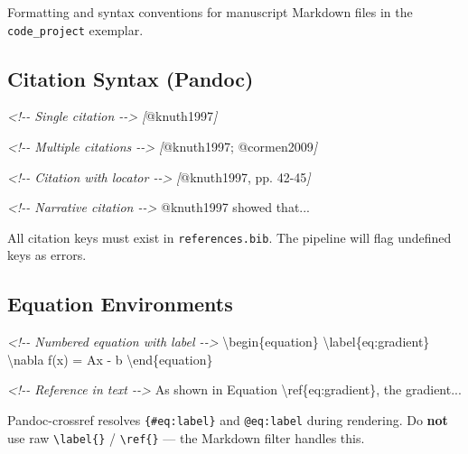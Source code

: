 \documentclass[
]{article}
\newenvironment{Shaded}{}{}
\newcommand{\CommentTok}[1]{\textcolor[rgb]{0.38,0.63,0.69}{\textit{#1}}}
\newcommand{\NormalTok}[1]{#1}
\newcommand{\OtherTok}[1]{\textcolor[rgb]{0.00,0.44,0.13}{#1}}
\begin{document}
Formatting and syntax conventions for manuscript Markdown files in the
\texttt{code\_project} exemplar.

\subsection{Citation Syntax (Pandoc)}\label{citation-syntax-pandoc}

\begin{Shaded}
\begin{Highlighting}[]
\CommentTok{\textless{}!{-}{-} Single citation {-}{-}\textgreater{}}
\CommentTok{[}\OtherTok{@knuth1997}\CommentTok{]}

\CommentTok{\textless{}!{-}{-} Multiple citations {-}{-}\textgreater{}}
\CommentTok{[}\OtherTok{@knuth1997; @cormen2009}\CommentTok{]}

\CommentTok{\textless{}!{-}{-} Citation with locator {-}{-}\textgreater{}}
\CommentTok{[}\OtherTok{@knuth1997, pp. 42{-}45}\CommentTok{]}

\CommentTok{\textless{}!{-}{-} Narrative citation {-}{-}\textgreater{}}
\NormalTok{@knuth1997 showed that...}
\end{Highlighting}
\end{Shaded}

All citation keys must exist in \texttt{references.bib}. The pipeline
will flag undefined keys as errors.

\subsection{Equation Environments}\label{equation-environments}

\begin{Shaded}
\begin{Highlighting}[]
\CommentTok{\textless{}!{-}{-} Numbered equation with label {-}{-}\textgreater{}}
\NormalTok{\textbackslash{}begin\{equation\}}
\NormalTok{\textbackslash{}label\{eq:gradient\}}
\NormalTok{\textbackslash{}nabla f(x) = Ax {-} b}
\NormalTok{\textbackslash{}end\{equation\}}

\CommentTok{\textless{}!{-}{-} Reference in text {-}{-}\textgreater{}}
\NormalTok{As shown in Equation \textbackslash{}ref\{eq:gradient\}, the gradient...}
\end{Highlighting}
\end{Shaded}

Pandoc-crossref resolves \texttt{\{\#eq:label\}} and \texttt{@eq:label}
during rendering. Do \textbf{not} use raw
\texttt{\textbackslash{}label\{\}} / \texttt{\textbackslash{}ref\{\}}
--- the Markdown filter handles this.
\end{document}

